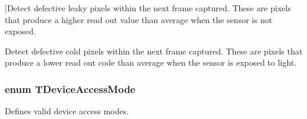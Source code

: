 \begin{Desc}
\begin{description}
{}]Detect defective leaky pixels within the next frame captured. These are pixels that produce a higher read out value than average when the sensor is not exposed. \item[{\em 
\hypertarget{group___common_interface_gga026aca333783574cb87c7cd7bebfc2fdad639154b8f85af57cd331df8aa148cda}{dpfm\+Calibrate\+Cold\+Pixel}\label{group___common_interface_gga026aca333783574cb87c7cd7bebfc2fdad639154b8f85af57cd331df8aa148cda}
}]Detect defective cold pixels within the next frame captured. These are pixels that produce a lower read out code than average when the sensor is exposed to light. \end{description}
\end{Desc}
\hypertarget{group___common_interface_ga9b3c160c06d68e5840aba2e4685389b8}{
\subsubsection[{T\+Device\+Access\+Mode}]{\setlength{\rightskip}{0pt plus 5cm}enum {\bf T\+Device\+Access\+Mode}}}\label{group___common_interface_ga9b3c160c06d68e5840aba2e4685389b8}


Defines valid device access modes. 

